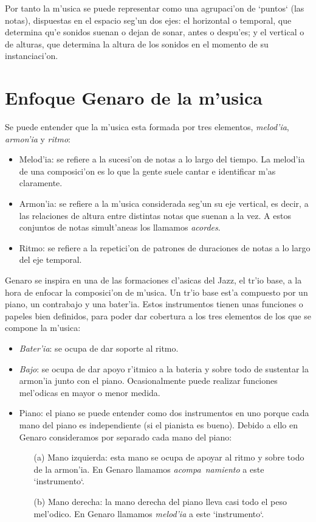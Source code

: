 \documentclass[a4paper,12pt]{article}
\begin{document}
Por tanto la m'usica se puede representar como una agrupaci'on de `puntos` (las notas), dispuestas en el espacio seg'un dos ejes: el horizontal o temporal, que determina qu'e sonidos suenan o dejan de sonar, antes o despu'es; y el vertical o de alturas, que determina la altura de los sonidos en el momento de su instanciaci'on.

\section{Enfoque Genaro de la m'usica}
Se puede entender que la m'usica esta formada por tres elementos, \emph{melod'ia}, \emph{armon'ia} y \emph{ritmo}:
\begin{itemize}
\item Melod'ia: se refiere a la sucesi'on de notas a lo largo del tiempo. La melod'ia de una composici'on es lo que la gente suele cantar e identificar m'as claramente.
\item Armon'ia: se refiere a la m'usica considerada seg'un su eje vertical, es decir, a las relaciones de altura entre distintas notas que suenan a la vez. A estos conjuntos de notas simult'aneas los llamamos \emph{acordes}.
\item Ritmo: se refiere a la repetici'on de patrones de duraciones de notas a lo largo del eje temporal.
\end{itemize}

Genaro se inspira en una de las formaciones cl'asicas del Jazz, el tr'io base, a la hora de enfocar la composici'on de m'usica. Un tr'io base est'a compuesto por un piano, un contrabajo y una bater'ia. Estos instrumentos tienen unas funciones o papeles bien definidos, para poder dar cobertura a los tres elementos de los que se compone la m'usica:
\begin{itemize}
\item \emph{Bater'ia}: se ocupa de dar soporte al ritmo.
\item \emph{Bajo}: se ocupa de dar apoyo r'itmico a la bateria y sobre todo de sustentar la armon'ia junto con el piano. Ocasionalmente puede realizar funciones mel'odicas en mayor o menor medida.
\item Piano: el piano se puede entender como dos instrumentos en uno porque cada mano del piano es independiente (si el pianista es bueno). Debido a ello en Genaro consideramos por separado cada mano del piano:
        \begin{enumerate}
        \item[(a)] Mano izquierda: esta mano se ocupa de apoyar al ritmo y sobre todo de la armon'ia. En Genaro llamamos \emph{acompa~namiento} a este `instrumento`.
        \item[(b)] Mano derecha: la mano derecha del piano lleva casi todo el peso mel'odico. En Genaro llamamos \emph{melod'ia} a este `instrumento`.
        \end{enumerate}
\end{itemize}
\end{document}
